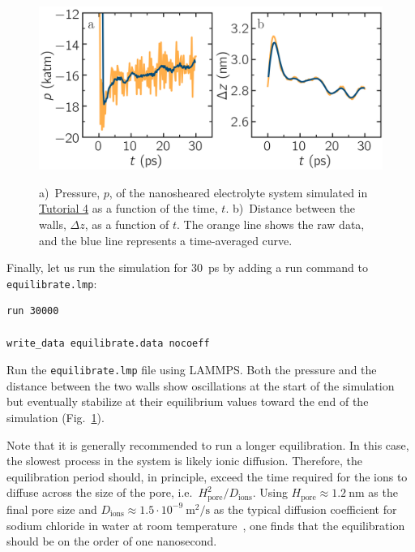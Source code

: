 \documentclass[9pt,tutorial]{livecoms}
\newcommand{\lmpcmd}[1]{\colorbox{listing}{\textcolor{command}{\small{#1}}}} %
\newcommand{\flecmd}[1]{\textcolor{command}{\texttt{#1}}} %
\begin{document}
\begin{figure}
\centering
\includegraphics[width=\linewidth]{NANOSHEAR-equilibration}\\[-2ex]
\caption{a)~Pressure, $p$, of the nanosheared electrolyte system
simulated in \hyperref[sheared-confined-label]{Tutorial 4} as a function of the
time, $t$.  b)~Distance between the walls, $\Delta z$, as a function of $t$.
The orange line shows the raw data, and the blue line represents a time-averaged curve.}
\label{fig:NANOSHEAR-equilibration}
\end{figure}

Finally, let us run the simulation for 30~ps by adding a \lmpcmd{run} command
to \flecmd{equilibrate.lmp}:
\begin{lstlisting}
run 30000

write_data equilibrate.data nocoeff
\end{lstlisting}
Run the \flecmd{equilibrate.lmp} file using LAMMPS.  Both the pressure and the distance
between the two walls show oscillations at the start of the simulation
but eventually stabilize at their equilibrium values toward
the end of the simulation (Fig.~\ref{fig:NANOSHEAR-equilibration}).

\begin{note}
  Note that it is generally recommended to run a longer equilibration.  In this case,
  the slowest process in the system is likely ionic diffusion.
  Therefore, the equilibration period should, in principle, exceed the time required
  for the ions to diffuse across the size of the pore, i.e.~$H_\text{pore}^2/D_\text{ions}$.
  Using $H_\text{pore} \approx 1.2~\text{nm}$ as the final pore size
  and $D_\text{ions} \approx 1.5 \cdot 10^{-9}~\text{m}^2/\text{s}$
  as the typical diffusion coefficient for sodium chloride in water at room
  temperature~\cite{mills1955remeasurement}, one finds that the equilibration
  should be on the order of one nanosecond.
\end{note}
\end{document}
